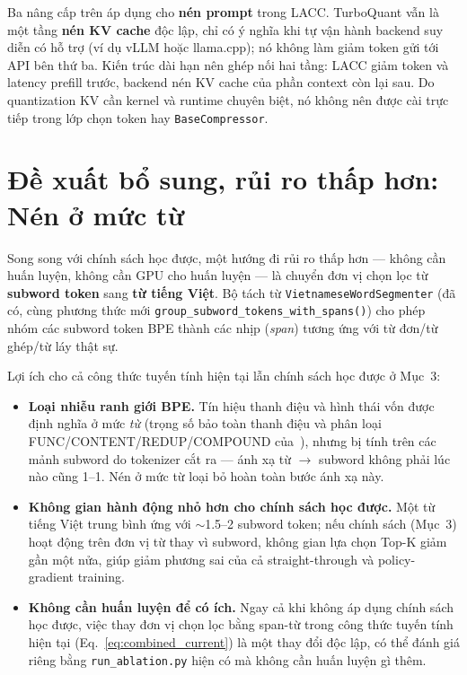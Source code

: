 \documentclass[12pt,a4paper]{article}
\newcommand{\method}[1]{\textsc{#1}}         %
\begin{document}
Ba nâng cấp trên áp dụng cho \textbf{nén prompt} trong \method{LACC}. TurboQuant vẫn là một tầng \textbf{nén KV cache} độc lập, chỉ có ý nghĩa khi tự vận hành backend suy diễn có hỗ trợ (ví dụ vLLM hoặc llama.cpp); nó không làm giảm token gửi tới API bên thứ ba. Kiến trúc dài hạn nên ghép nối hai tầng: \method{LACC} giảm token và latency prefill trước, backend nén KV cache của phần context còn lại sau. Do quantization KV cần kernel và runtime chuyên biệt, nó không nên được cài trực tiếp trong lớp chọn token hay \texttt{BaseCompressor}.


\section{Đề xuất bổ sung, rủi ro thấp hơn: Nén ở mức từ}

Song song với chính sách học được, một hướng đi rủi ro thấp hơn --- không cần huấn luyện, không cần GPU cho huấn luyện --- là chuyển đơn vị chọn lọc từ \textbf{subword token} sang \textbf{từ tiếng Việt}. Bộ tách từ \texttt{VietnameseWordSegmenter} (đã có, cùng phương thức mới \texttt{group\_subword\_tokens\_with\_spans()}) cho phép nhóm các subword token BPE thành các nhịp (\textit{span}) tương ứng với từ đơn/từ ghép/từ láy thật sự.

Lợi ích cho cả công thức tuyến tính hiện tại lẫn chính sách học được ở Mục~3:

\begin{itemize}
    \item \textbf{Loại nhiễu ranh giới BPE.} Tín hiệu thanh điệu và hình thái vốn được định nghĩa ở mức \emph{từ} (trọng số bảo toàn thanh điệu và phân loại FUNC/CONTENT/REDUP/COMPOUND của~\cite{lacc2026}), nhưng bị tính trên các mảnh subword do tokenizer cắt ra --- ánh xạ từ $\to$ subword không phải lúc nào cũng 1--1. Nén ở mức từ loại bỏ hoàn toàn bước ánh xạ này.
    \item \textbf{Không gian hành động nhỏ hơn cho chính sách học được.} Một từ tiếng Việt trung bình ứng với $\sim$1.5--2 subword token; nếu chính sách (Mục~3) hoạt động trên đơn vị từ thay vì subword, không gian lựa chọn Top-K giảm gần một nửa, giúp giảm phương sai của cả straight-through và policy-gradient training.
    \item \textbf{Không cần huấn luyện để có ích.} Ngay cả khi không áp dụng chính sách học được, việc thay đơn vị chọn lọc bằng span-từ trong công thức tuyến tính hiện tại (Eq.~\ref{eq:combined_current}) là một thay đổi độc lập, có thể đánh giá riêng bằng \texttt{run\_ablation.py} hiện có mà không cần huấn luyện gì thêm.
\end{itemize}
\end{document}
